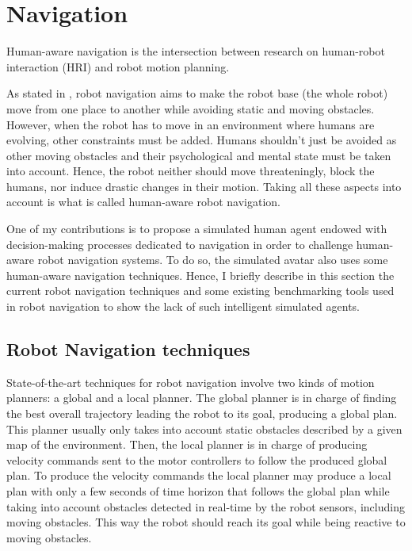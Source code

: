 \section{Navigation}

Human-aware navigation is the intersection between research on human-robot interaction (HRI) and robot motion planning.

As stated in \cite{thesisBuisan21}, robot navigation aims to make the robot base (the whole robot) move from one place to another while avoiding static and moving obstacles. However, when the robot has to move in an environment where humans are evolving, other constraints must be added. 
Humans shouldn't just be avoided as other moving obstacles and their psychological and mental state must be taken into account. Hence, the robot neither should move threateningly, block the humans, nor induce drastic changes in their motion. Taking all these aspects into account is what is called human-aware robot navigation.

One of my contributions is to propose a simulated human agent endowed with decision-making processes dedicated to navigation in order to challenge human-aware robot navigation systems. To do so, the simulated avatar also uses some human-aware navigation techniques. Hence, I briefly describe in this section the current robot navigation techniques and some existing benchmarking tools used in robot navigation to show the lack of such intelligent simulated agents.

\subsection{Robot Navigation techniques}

State-of-the-art techniques for robot navigation involve two kinds of motion planners: a global and a local planner. The global planner is in charge of finding the best overall trajectory leading the robot to its goal, producing a global plan. This planner usually only takes into account static obstacles described by a given map of the environment. Then, the local planner is in charge of producing velocity commands sent to the motor controllers to follow the produced global plan. To produce the velocity commands the local planner may produce a local plan with only a few seconds of time horizon that follows the global plan while taking into account obstacles detected in real-time by the robot sensors, including moving obstacles. This way the robot should reach its goal while being reactive to moving obstacles. 

